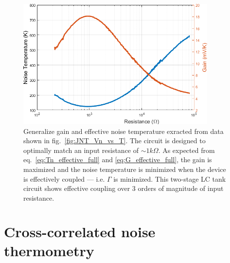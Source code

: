 \begin{figure}
\centering
\includegraphics[width = 100mm]{figures/Johnson_noise_thermometry/G_Tn_vs_R}
\caption{Generalize gain and effective noise temperature exracted from data shown in fig.~\ref{fig:JNT_Vn_vs_T}. The circuit is designed to optimally match an input resistance of ${\sim}1k\Omega$. As expected from eq.~\ref{eq:Tn_effective_full} and \ref{eq:G_effective_full}, the gain is maximized and the noise temperature is minimized when the device is effectively coupled --- i.e. $\Gamma$ is minimized. This two-stage LC tank circuit shows effective coupling over $3$ orders of magnitude of input resistance.}
\label{fig:JNT_G_Tn_vs_T}
\end{figure}


\section{Cross-correlated noise thermometry}

